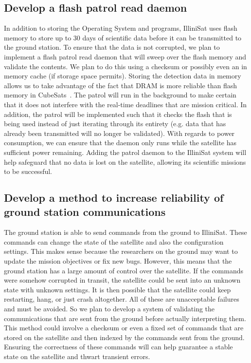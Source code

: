 \subsection{Develop a flash patrol read daemon}
In addition to storing the Operating System and programs, IlliniSat uses flash
memory to store up to 30 days of scientific data before it can be transmitted to
the ground station.  To ensure that the data is not corrupted, we plan to
implement a flash patrol read daemon that will sweep over the flash memory and
validate the contents. We plan to do this using a checksum or possibly even an
in memory cache (if storage space permits).  Storing the detection data in
memory allows us to take advantage of the fact that DRAM is more reliable than
flash memory in CubeSats~\cite{odegaard2013error}.  The patrol will run in the
background to make certain that it does not interfere with the real-time
deadlines that are mission critical.  In addition, the patrol will be
implemented such that it checks the flash that is being used instead of just
iterating through its entirety (e.g.  data that has already been transmitted
will no longer be validated). With regards to power consumption, we can ensure
that the daemon only runs while the satellite has sufficient power remaining.
Adding the patrol daemon to the IlliniSat system will help safeguard that no
data is lost on the satellite, allowing its scientific missions to be
successful.

\subsection{Develop a method to increase reliability of ground station
communications}
The ground station is able to send commands from the ground to IlliniSat. These commands
can change the state of the satellite and also the configuration settings. This makes sense because the
researchers on the ground may want to update the mission objectives or fix new bugs. However, this
means that the ground station has a large amount of control over the
satellite. If the commands were somehow corrupted in transit,
the satellite could be sent into an unknown state with unknown settings. 
It is then possible that the satellite could keep restarting, hang, or just crash altogether. All of these are
unacceptable failures and must be avoided. So we plan to develop a system of validating the 
communications that are sent from the ground before actually interpreting them. This method could 
involve a checksum or even a fixed set of commands that are stored on the satellite and then indexed 
by the commands sent from the ground. Ensuring the correctness of these commands
will can help guarantee a stable state
on the satellite and thwart transient errors.
